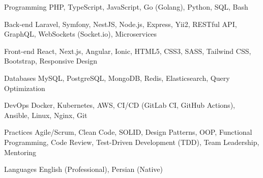 

\begin{cvskills}

\cvskill
{Programming} %
{PHP, TypeScript, JavaScript, Go (Golang), Python, SQL, Bash} %

\cvskill
{Back-end} %
{Laravel, Symfony, NestJS, Node.js, Express, Yii2, RESTful API, GraphQL, WebSockets (Socket.io), Microservices} %

\cvskill
{Front-end} %
{React, Next.js, Angular, Ionic, HTML5, CSS3, SASS, Tailwind CSS, Bootstrap, Responsive Design} %

\cvskill
{Databases} %
{MySQL, PostgreSQL, MongoDB, Redis, Elasticsearch, Query Optimization} %

\cvskill
{DevOps} %
{Docker, Kubernetes, AWS, CI/CD (GitLab CI, GitHub Actions), Ansible, Linux, Nginx, Git} %

\cvskill
{Practices} %
{Agile/Scrum, Clean Code, SOLID, Design Patterns, OOP, Functional Programming, Code Review, Test-Driven Development (TDD), Team Leadership, Mentoring} %

\cvskill
{Languages} %
{English (Professional), Persian (Native)} %

\end{cvskills}
